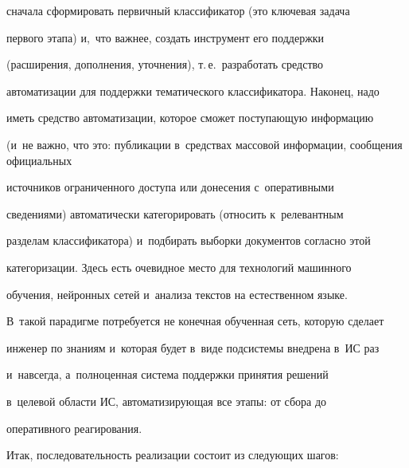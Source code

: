 сначала сформировать первичный классификатор (это ключевая задача 

первого этапа) и,~что важнее, создать инструмент его поддержки 

(расширения, дополнения, уточнения), т.\,е.\ разработать средство 

автоматизации для поддержки тематического классификатора. Наконец, надо 

иметь средство автоматизации, которое сможет поступающую информацию 

(и~не важно, что это: публикации в~средствах массовой информации, сообщения официальных 

источников ограниченного доступа или донесения с~оперативными 

сведениями) автоматически категорировать (относить к~релевантным 

разделам классификатора) и~подбирать выборки документов согласно этой 

категоризации. Здесь есть очевидное место для технологий машинного 

обучения, нейронных сетей и~анализа текстов на естественном языке. 

В~такой парадигме потребуется не конечная обученная сеть, которую сделает 

инженер по знаниям и~которая будет в~виде подсистемы внедрена в~ИС раз 

и~навсегда, а~полноценная система поддержки принятия решений  

в~целевой об\-ласти ИС, автоматизирующая все этапы: от сбора до 

оперативного реагирования.

     Итак, последовательность реализации состоит из следующих шагов:

